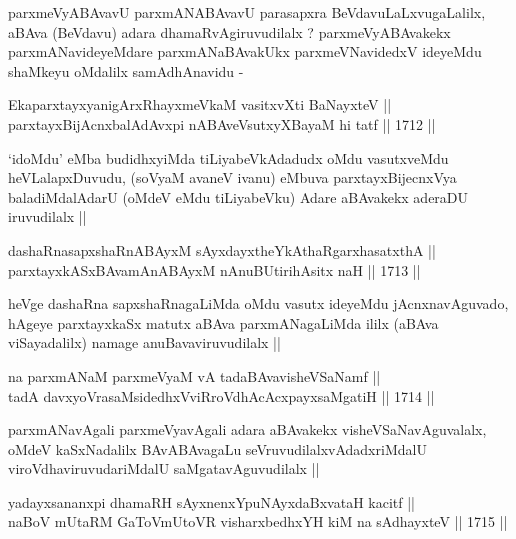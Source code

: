 \begin{artha}
parxmeVyABAvavU parxmANABAvavU parasapxra BeVdavuLaLxvugaLalilx,
  aBAva (BeVdavu) adara dhamaRvAgiruvudilalx ? parxmeVyABAvakekx
  parxmANavideyeMdare parxmANaBAvakUkx parxmeVNavidedxV ideyeMdu
  shaMkeyu oMdalilx samAdhAnavidu -
\end{artha}

\begin{shl}
EkaparxtayxyanigArxRhayxmeVkaM vasitxvXti BaNayxteV || \\
parxtayxBijAcnxbalAdAvx\s pi nABAveV\s sutxyXBayaM hi tatf ||  1712 ||  
\end{shl}

\begin{artha}
`idoMdu' eMba budidhxyiMda tiLiyabeVkAdadudx oMdu vasutxveMdu
  heVLalapxDuvudu, (soV\s yaM avaneV ivanu) eMbuva parxtayxBijecnxVya
  baladiMdalAdarU (oMdeV eMdu tiLiyabeVku) Adare aBAvakekx aderaDU
  iruvudilalx ||
\end{artha}


\begin{shl}
dashaRnasapxshaRnABAyxM sAyxdayxtheYkAthaRgarxhasatxthA || \\
parxtayxkASxBAvamAnABAyxM nAnuBUtirihAsitx naH ||  1713 ||  
\end{shl}

\begin{artha}
heVge dashaRna sapxshaRnagaLiMda oMdu vasutx ideyeMdu jAcnxnavAguvado,
hAgeye parxtayxkaSx matutx aBAva parxmANagaLiMda ililx (aBAva
viSayadalilx) namage anuBavaviruvudilalx ||
\end{artha}

\begin{shl}
na parxmANaM parxmeVyaM vA tadaBAvavisheVSaNamf || \\
tadA davxyoVrasaMsidedhxVviRroVdhAcAcxpayxsaMgatiH ||  1714 ||  
\end{shl}

\begin{artha}
parxmANavAgali parxmeVyavAgali adara aBAvakekx visheVSaNavAguvalalx,
oMdeV kaSxNadalilx BAvABAvagaLu seVruvudilalxvAdadxriMdalU
viroVdhaviruvudariMdalU saMgatavAguvudilalx ||
\end{artha}


\begin{shl}
yadayxsananxpi dhamaRH sAyxnenxYpuNAyxdaBxvataH kacitf || \\
naBoV mUtaRM GaToV\s mUtoVR visharxbedhxYH kiM na sAdhayxteV ||  1715 ||  
\end{shl}

